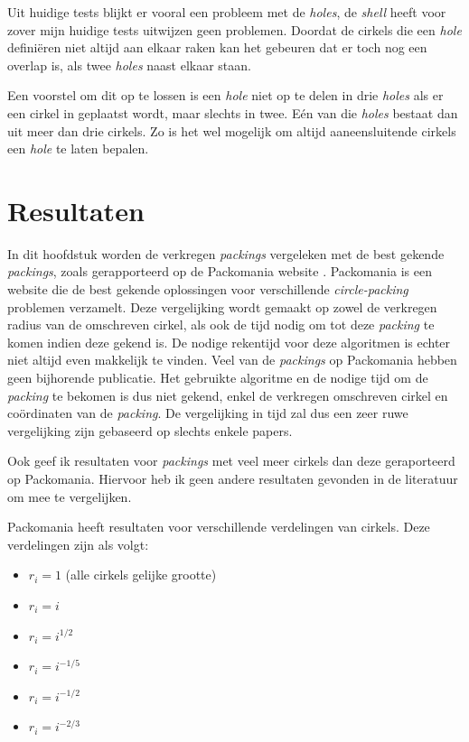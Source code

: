 \documentclass[12pt,a4paper,oneside]{book}
\begin{document}
Uit huidige tests blijkt er vooral een probleem met de \textit{holes}, de \textit{shell} heeft voor zover mijn huidige tests uitwijzen geen problemen.
Doordat de cirkels die een \textit{hole} definiëren niet altijd aan elkaar raken kan het gebeuren dat er toch nog een overlap is, als twee \textit{holes} naast elkaar staan.

Een voorstel om dit op te lossen is een \textit{hole} niet op te delen in drie \textit{holes} als er een cirkel in geplaatst wordt, maar slechts in twee.
Eén van die \textit{holes} bestaat dan uit meer dan drie cirkels.
Zo is het wel mogelijk om altijd aaneensluitende cirkels een \textit{hole} te laten bepalen.

\chapter{Resultaten} \label{chap:resultaten}

In dit hoofdstuk worden de verkregen \textit{packings} vergeleken met de best gekende \textit{packings}, zoals gerapporteerd op de Packomania website \cite{packomania}.
Packomania is een website die de best gekende oplossingen voor verschillende \textit{circle-packing} problemen verzamelt.
Deze vergelijking wordt gemaakt op zowel de verkregen radius van de omschreven cirkel, als ook de tijd nodig om tot deze \textit{packing} te komen indien deze gekend is.
De nodige rekentijd voor deze algoritmen is echter niet altijd even makkelijk te vinden.
Veel van de \textit{packings} op Packomania hebben geen bijhorende publicatie.
Het gebruikte algoritme en de nodige tijd om de \textit{packing} te bekomen is dus niet gekend, enkel de verkregen omschreven cirkel en coördinaten van de \textit{packing}.
De vergelijking in tijd zal dus een zeer ruwe vergelijking zijn gebaseerd op slechts enkele papers.

Ook geef ik resultaten voor \textit{packings} met veel meer cirkels dan deze geraporteerd op Packomania.
Hiervoor heb ik geen andere resultaten gevonden in de literatuur om mee te vergelijken.

Packomania heeft resultaten voor verschillende verdelingen van cirkels.
Deze verdelingen zijn als volgt:

\begin{itemize}
	\item $r_i=1$ (alle cirkels gelijke grootte)
	\item $r_i=i$
	\item $r_i=i^{1/2}$
	\item $r_i=i^{-1/5}$
	\item $r_i=i^{-1/2}$
	\item $r_i=i^{-2/3}$
\end{itemize}
\end{document}
